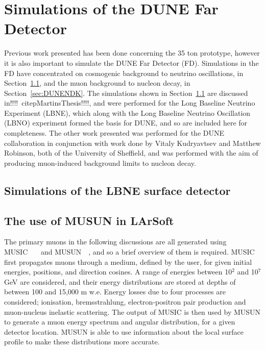 
\chapter{Simulations of the DUNE Far Detector}  %
\graphicspath{{FarDetectorSimulations/Figs/Raster/}{FarDetectorSimulations/Figs/PDF/}{FarDetectorSimulations/Figs/}}

Previous work presented has been done concerning the 35 ton prototype, however it is also important to simulate the DUNE Far Detector (FD). Simulations in the FD have concentrated on cosmogenic background to neutrino oscillations, in Section~\ref{sec:LBNESurf}, and the muon background to nucleon decay, in Section~\ref{sec:DUNENDK}. The simulations shown in Section~\ref{sec:LBNESurf} are discussed in!!!!~citep{MartinsThesis}!!!!, and were performed for the Long Baseline Neutrino Experiment (LBNE), which along with the Long Baseline Neutrino Oscillation (LBNO) experiment formed the basis for DUNE, and so are included here for completeness. The other work presented was performed for the DUNE collaboration in conjunction with work done by Vitaly Kudryavtsev and Matthew Robinson, both of the University of Sheffield, and was performed with the aim of producing muon-induced background limits to nucleon decay. \\

\section{Simulations of the LBNE surface detector} \label{sec:LBNESurf} %

\section{The use of MUSUN in LArSoft} \label{sec:FDIncorporation}  %
The primary muons in the following discussions are all generated using MUSIC~\citep{MUSUN}~\citep{MUSIC}~\citep{MUSIC2} and MUSUN~\citep{MUSUN}~\citep{MUSUN2}, and so a brief overview of them is required. MUSIC first propagates muons through a medium, defined by the user, for given initial energies, positions, and direction cosines. A range of energies between 10$^2$ and 10$^7$ GeV are considered, and their energy distributions are stored at depths of between 100 and 15,000 m w.e. Energy losses due to four processes are considered; ionisation, bremsstrahlung, electron-positron pair production and muon-nucleus inelastic scattering. The output of MUSIC is then used by MUSUN to generate a muon energy spectrum and angular distribution, for a given detector location. MUSUN is able to use information about the local surface profile to make these distributions more accurate. \\

